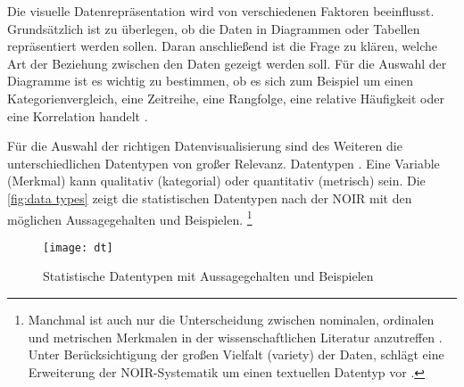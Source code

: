 
Die visuelle Datenrepräsentation wird von verschiedenen Faktoren beeinflusst.
Grundsätzlich ist zu überlegen, ob die Daten in Diagrammen oder Tabellen repräsentiert werden sollen.
Daran anschließend ist die Frage zu klären, welche Art der Beziehung zwischen den Daten gezeigt werden soll.
Für die Auswahl der Diagramme ist es wichtig zu bestimmen, ob es sich zum Beispiel um einen Kategorienvergleich, eine Zeitreihe, eine Rangfolge, 
eine relative Häufigkeit oder eine Korrelation handelt \cite[vgl.][137]{few_show_2012}.

Für die Auswahl der richtigen Datenvisualisierung sind des Weiteren die unterschiedlichen Datentypen von großer Relevanz.
Datentypen  \cite[99]{kirk_data_2019}.  Eine Variable (Merkmal) kann qualitativ (kategorial) oder quantitativ (metrisch) sein.
Die \autoref{fig:data types} zeigt die statistischen Datentypen nach der \acrfull{NOIR} 
\cite[vgl.][12 ff.]{bortz_statistik_2010} mit den möglichen Aussagegehalten und Beispielen.
\footnote{Manchmal ist auch nur die Unterscheidung zwischen nominalen, ordinalen und metrischen
Merkmalen in der wissenschaftlichen Literatur anzutreffen \cite[vgl.][20]{cleff_deskriptive_2011}. 
Unter Berücksichtigung der großen Vielfalt (variety) der Daten, schlägt  
eine Erweiterung der \acrshort{NOIR}-Systematik um einen textuellen Datentyp vor \cite[vgl.][100]{kirk_data_2019}.}

 
 \begin{figure}[h]
    \centering
        \texttt{[image: dt]}
        \caption{Statistische Datentypen mit Aussagegehalten und Beispielen}
        \label{fig:data types}
\end{figure}


